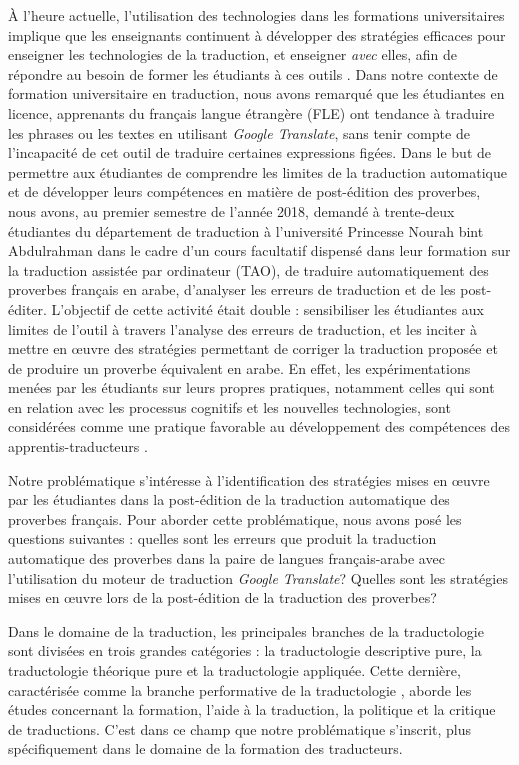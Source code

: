 \documentclass[french]{textolivre}
\begin{document}
À l’heure actuelle, l’utilisation des technologies dans les formations universitaires implique que les enseignants continuent à développer des stratégies efficaces pour enseigner les technologies de la traduction, et enseigner \textit{avec} elles, afin de répondre au besoin de former les étudiants à ces outils \cite[p.~72]{marshman_translation_2012}. Dans notre contexte de formation universitaire en traduction, nous avons remarqué que les étudiantes en licence, apprenants du français langue étrangère (FLE) ont tendance à traduire les phrases ou les textes en utilisant \textit{Google Translate}, sans tenir compte de l’incapacité de cet outil de traduire certaines expressions figées. Dans le but de permettre aux étudiantes de comprendre les limites de la traduction automatique et de développer leurs compétences en matière de post-édition des proverbes, nous avons, au premier semestre de l’année 2018, demandé à trente-deux étudiantes du département de traduction à l’université Princesse Nourah bint Abdulrahman dans le cadre d’un cours facultatif dispensé dans leur formation sur la traduction assistée par ordinateur (TAO), de traduire automatiquement des proverbes français en arabe, d’analyser les erreurs de traduction et de les post-éditer. L’objectif de cette activité était double : sensibiliser les étudiantes aux limites de l’outil à travers l’analyse des erreurs de traduction, et les inciter à mettre en œuvre des stratégies permettant de corriger la traduction proposée et de produire un proverbe équivalent en arabe.  En effet, les expérimentations menées par les étudiants sur leurs propres pratiques, notamment celles qui sont en relation avec les processus cognitifs et les nouvelles technologies, sont considérées comme une pratique favorable au développement des compétences des apprentis-traducteurs \cite[p.~200]{pym_designing_2016}.

Notre problématique s’intéresse à l’identification des stratégies mises en œuvre par les étudiantes dans la post-édition de la traduction automatique des proverbes français. Pour aborder cette problématique, nous avons posé les questions suivantes : quelles sont les erreurs que produit la traduction automatique des proverbes dans la paire de langues français-arabe avec l’utilisation du moteur de traduction \textit{Google Translate}? Quelles sont les stratégies mises en œuvre lors de la post-édition de la traduction des proverbes? 

Dans le domaine de la traduction, les principales branches de la traductologie sont divisées en trois grandes catégories : la traductologie descriptive pure, la traductologie théorique pure et la traductologie appliquée. Cette dernière, caractérisée comme la branche performative de la traductologie \cite[p.~7]{rabadan_applied_2010}, aborde les études concernant la formation, l’aide à la traduction, la politique et la critique de traductions. C’est dans ce champ que notre problématique s’inscrit, plus spécifiquement dans le domaine de la formation des traducteurs.
\end{document}
